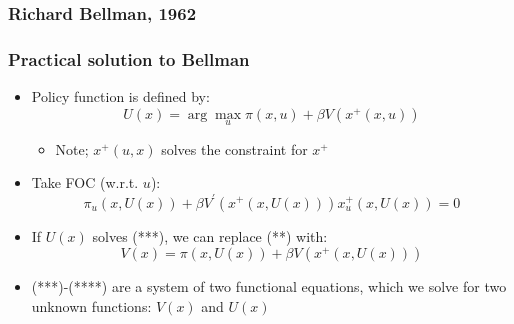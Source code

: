 \documentclass[bigger,handout]{beamer}
\begin{document}
\begin{frame}%

\frametitle{Richard Bellman, 1962}




\end{frame}%



\begin{frame}%

\frametitle{Practical solution to Bellman}

\begin{itemize}
\item Policy function is defined by:\textbf{\ }%
\begin{equation*}
U(x)=\arg \max_{u}\pi (x,u)+\beta V(x^{+}\left( x,u\right) )
\end{equation*}

\begin{itemize}
\item Note; $x^{+}\left( u,x\right) $ solves the constraint for $x^{+}$
\end{itemize}

\item Take FOC (w.r.t. $u$):%
\begin{equation}
\pi _{u}(x,U(x))+\beta V^{\prime }(x^{+}(x,U(x)))x_{u}^{+}(x,U(x))=0
\tag{***}
\end{equation}

\item If $U(x)$ solves (***), we can replace (**) with:%
\begin{equation}
V(x)=\pi (x,U(x))+\beta V(x^{+}\left( x,U(x)\right) )  \tag{****}
\end{equation}

\item (***)-(****) are a system of two functional equations,\newline
which we solve for two unknown functions: $V\left( x\right) $ and $U\left(
x\right) $
\end{itemize}



\end{frame}%
\end{document}
